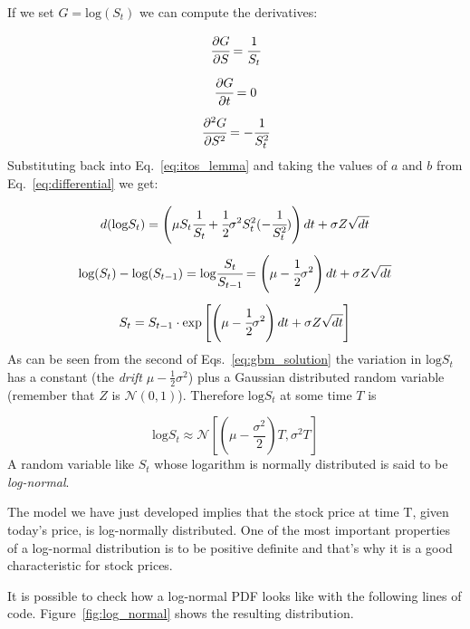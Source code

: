 If we set \(G = \textrm{log}(S_t)\) we can compute the derivatives:

\begin{equation}
\begin{gathered}
\cfrac{\partial G}{\partial S} = \cfrac{1}{S_t}\\[5pt]
\cfrac{\partial G}{\partial t} = 0\\[5pt]
\cfrac{\partial^2 G}{\partial S^2} = -\cfrac{1}{S_t^{2}}
\end{gathered}
\end{equation}
Substituting back into Eq.~\ref{eq:itos_lemma} and taking the values of $a$ and $b$ from Eq.~\ref{eq:differential} we get:

\begin{equation}
\begin{gathered}
d(\textrm{log} S_t) = \left(\mu S_t \cfrac{1}{S_t} + \cfrac{1}{2}\sigma^2 S_t^2 (-\cfrac{1}{S_t^2})\right)dt + \sigma Z\sqrt{dt}\\[5pt]
\textrm{log} (S_t) - \textrm{log} (S_{t-1}) = \textrm{log} \cfrac{S_t}{S_{t-1}} = \left(\mu - \cfrac{1}{2}\sigma^2\right)dt + \sigma Z\sqrt{dt}\\[5pt]
S_t = S_{t-1}\cdot\textrm{exp}\left[\left(\mu - \cfrac{1}{2}\sigma^2\right)dt + \sigma Z\sqrt{dt}\right]
\end{gathered}
\label{eq:gbm_solution}
\end{equation}
As can be seen from the second of Eqs.~\ref{eq:gbm_solution} the variation in \(\textrm{log} S_t\) has a constant (the \emph{drift} \(\mu - \frac{1}{2}\sigma^2\)) plus a Gaussian distributed random variable (remember that $Z$ is \(\mathcal{N}(0,1)\)). Therefore \(\textrm{log} S_t\) at some time \(T\) is 

\begin{equation}
\textrm{log}S_t \approx\mathcal{N}\left[\left(\mu-\frac{\sigma^2}{2}\right)T, \sigma^2 T\right]
\end{equation}
A random variable like \(S_t\) whose logarithm is normally distributed is said to be \emph{log-normal}. 

The model we have just developed implies that the stock price at time T, given today's price, is log-normally distributed. One of the most important properties of a log-normal distribution is to be positive definite and that's why it is a good characteristic for stock prices. 

It is possible to check how a log-normal PDF looks like with the following lines of code. Figure~\ref{fig:log_normal} shows the resulting distribution.

